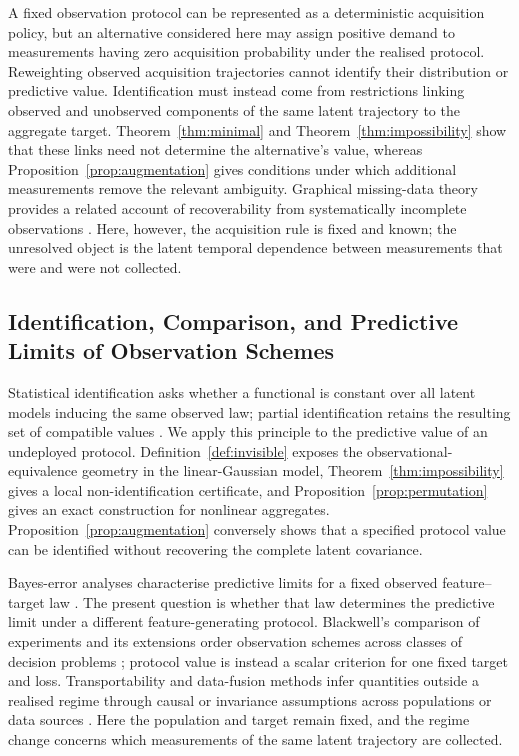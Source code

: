A fixed observation protocol can be represented as a deterministic acquisition
policy, but an alternative considered here may assign positive demand to
measurements having zero acquisition probability under the realised protocol.
Reweighting observed acquisition trajectories cannot identify their
distribution or predictive value. Identification must instead come from
restrictions linking observed and unobserved components of the same latent
trajectory to the aggregate target. Theorem~\ref{thm:minimal} and
Theorem~\ref{thm:impossibility} show that these links need not determine the
alternative's value, whereas Proposition~\ref{prop:augmentation} gives
conditions under which additional measurements remove the relevant ambiguity.
Graphical missing-data theory provides a related account of recoverability from
systematically incomplete observations
\citep{mohan2021graphical,nabi2020full}. Here, however, the acquisition rule is
fixed and known; the unresolved object is the latent temporal dependence
between measurements that were and were not collected.

\subsection{Identification, Comparison, and Predictive Limits of Observation Schemes}
\label{sec:rw-identification}

Statistical identification asks whether a functional is constant over all
latent models inducing the same observed law; partial identification retains
the resulting set of compatible values
\citep{koopmans1950identification,rothenberg1971identification,
manski2003partial,tamer2010partial}. We apply this principle to the predictive
value of an undeployed protocol. Definition~\ref{def:invisible} exposes the
observational-equivalence geometry in the linear-Gaussian model,
Theorem~\ref{thm:impossibility} gives a local non-identification certificate,
and Proposition~\ref{prop:permutation} gives an exact construction for
nonlinear aggregates. Proposition~\ref{prop:augmentation} conversely shows that
a specified protocol value can be identified without recovering the complete
latent covariance.

Bayes-error analyses characterise predictive limits for a fixed observed
feature--target law \citep{fukunaga1987bayes,ishida2023performance}. The present
question is whether that law determines the predictive limit under a different
feature-generating protocol. Blackwell's comparison of experiments and its
extensions order observation schemes across classes of decision problems
\citep{blackwell1953equivalent,lecam1990asymptotics,torgersen1991comparison};
protocol value is instead a scalar criterion for one fixed target and loss.
Transportability and data-fusion methods infer quantities outside a realised
regime through causal or invariance assumptions across populations or data
sources \citep{pearl2014external,bareinboim2016fusion}. Here the population and
target remain fixed, and the regime change concerns which measurements of the
same latent trajectory are collected.


